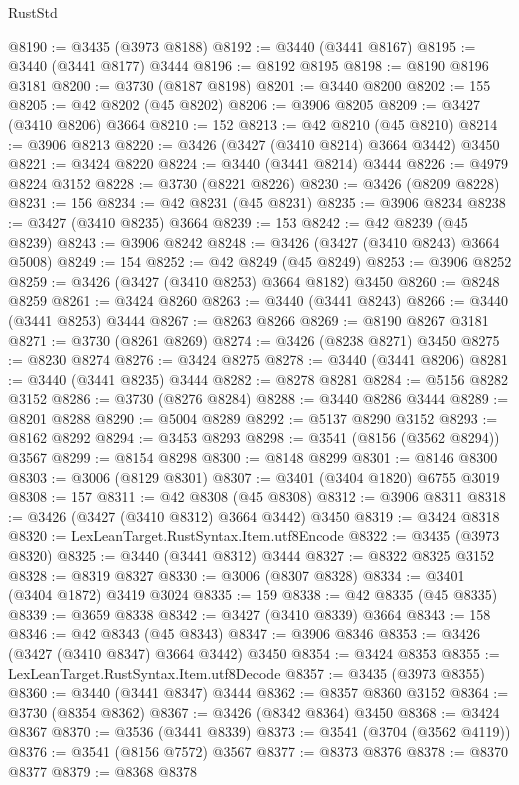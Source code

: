 \begin{lexlean}{RustStd}
\begin{coremodule}
@8190 := @3435 (@3973 @8188)
@8192 := @3440 (@3441 @8167)
@8195 := @3440 (@3441 @8177) @3444
@8196 := @8192 @8195
@8198 := @8190 @8196 @3181
@8200 := @3730 (@8187 @8198)
@8201 := @3440 @8200
@8202 := 155
@8205 := @42 @8202 (@45 @8202)
@8206 := @3906 @8205
@8209 := @3427 (@3410 @8206) @3664
@8210 := 152
@8213 := @42 @8210 (@45 @8210)
@8214 := @3906 @8213
@8220 := @3426 (@3427 (@3410 @8214) @3664 @3442) @3450
@8221 := @3424 @8220
@8224 := @3440 (@3441 @8214) @3444
@8226 := @4979 @8224 @3152
@8228 := @3730 (@8221 @8226)
@8230 := @3426 (@8209 @8228)
@8231 := 156
@8234 := @42 @8231 (@45 @8231)
@8235 := @3906 @8234
@8238 := @3427 (@3410 @8235) @3664
@8239 := 153
@8242 := @42 @8239 (@45 @8239)
@8243 := @3906 @8242
@8248 := @3426 (@3427 (@3410 @8243) @3664 @5008)
@8249 := 154
@8252 := @42 @8249 (@45 @8249)
@8253 := @3906 @8252
@8259 := @3426 (@3427 (@3410 @8253) @3664 @8182) @3450
@8260 := @8248 @8259
@8261 := @3424 @8260
@8263 := @3440 (@3441 @8243)
@8266 := @3440 (@3441 @8253) @3444
@8267 := @8263 @8266
@8269 := @8190 @8267 @3181
@8271 := @3730 (@8261 @8269)
@8274 := @3426 (@8238 @8271) @3450
@8275 := @8230 @8274
@8276 := @3424 @8275
@8278 := @3440 (@3441 @8206)
@8281 := @3440 (@3441 @8235) @3444
@8282 := @8278 @8281
@8284 := @5156 @8282 @3152
@8286 := @3730 (@8276 @8284)
@8288 := @3440 @8286 @3444
@8289 := @8201 @8288
@8290 := @5004 @8289
@8292 := @5137 @8290 @3152
@8293 := @8162 @8292
@8294 := @3453 @8293
@8298 := @3541 (@8156 (@3562 @8294)) @3567
@8299 := @8154 @8298
@8300 := @8148 @8299
@8301 := @8146 @8300
@8303 := @3006 (@8129 @8301)
@8307 := @3401 (@3404 @1820) @6755 @3019
@8308 := 157
@8311 := @42 @8308 (@45 @8308)
@8312 := @3906 @8311
@8318 := @3426 (@3427 (@3410 @8312) @3664 @3442) @3450
@8319 := @3424 @8318
@8320 := LexLeanTarget.RustSyntax.Item.utf8Encode
@8322 := @3435 (@3973 @8320)
@8325 := @3440 (@3441 @8312) @3444
@8327 := @8322 @8325 @3152
@8328 := @8319 @8327
@8330 := @3006 (@8307 @8328)
@8334 := @3401 (@3404 @1872) @3419 @3024
@8335 := 159
@8338 := @42 @8335 (@45 @8335)
@8339 := @3659 @8338
@8342 := @3427 (@3410 @8339) @3664
@8343 := 158
@8346 := @42 @8343 (@45 @8343)
@8347 := @3906 @8346
@8353 := @3426 (@3427 (@3410 @8347) @3664 @3442) @3450
@8354 := @3424 @8353
@8355 := LexLeanTarget.RustSyntax.Item.utf8Decode
@8357 := @3435 (@3973 @8355)
@8360 := @3440 (@3441 @8347) @3444
@8362 := @8357 @8360 @3152
@8364 := @3730 (@8354 @8362)
@8367 := @3426 (@8342 @8364) @3450
@8368 := @3424 @8367
@8370 := @3536 (@3441 @8339)
@8373 := @3541 (@3704 (@3562 @4119))
@8376 := @3541 (@8156 @7572) @3567
@8377 := @8373 @8376
@8378 := @8370 @8377
@8379 := @8368 @8378

\end{coremodule}
\end{lexlean}

